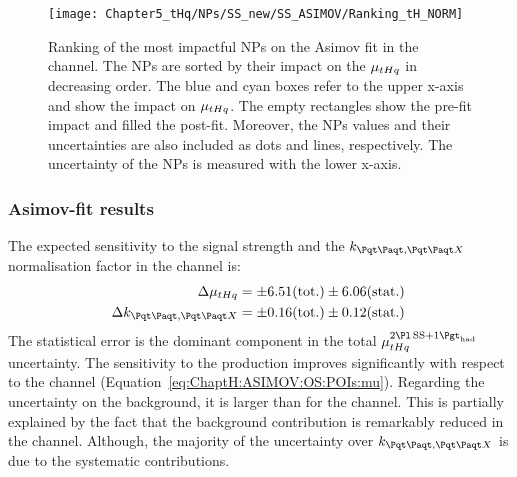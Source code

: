 \begin{figure}[h]%
    \centering
        \texttt{[image: Chapter5\_tHq/NPs/SS\_new/SS\_ASIMOV/Ranking\_tH\_NORM]}
    \caption{Ranking of the most impactful NPs on the Asimov fit in the \dilepSStau channel. 
    The NPs are sorted by their impact on the $\mu_{tHq}$ in decreasing order. 
    The blue and cyan boxes refer to the upper x-axis and show the impact on $\mu_{tHq}$.
    The empty rectangles show the pre-fit impact and filled the post-fit.
    Moreover, the NPs values and their uncertainties are also included as dots and 
    lines, respectively. The uncertainty of the NPs is measured with the lower x-axis.}
    \label{fig:ChaptH:Asimov:SS:Ranking}
\end{figure}




\subsubsection{Asimov-fit results \dilepSStau}
\label{sec:ChaptH:Fit:ASIMOV:SS:results}
The expected sensitivity to the \tHq signal strength and the $k_{\ttbar, \ttX}$ normalisation
factor in the \dilepSStau channel is:
\begin{align}
	\Delta \mu_{\tHq} 	&= \pm 6.51 (\text{tot.}) \pm 6.06 (\text{stat.}) 	\label{eq:ChaptH:Fit:ASIMOV:SS:mu} \\
	\Delta k_{\ttbar, \ttX} 	&= \pm 0.16 (\text{tot.}) \pm 0.12 (\text{stat.}) 	\label{eq:ChaptH:Fit:ASIMOV:SS:k} \,
\end{align}
The statistical error is the dominant component in the total $\mu^{\dilepSStau}_{\tHq}$ uncertainty.
The sensitivity to the \tHq production improves significantly with respect to the \dilepOStau channel
(Equation~\ref{eq:ChaptH:ASIMOV:OS:POIs:mu}). Regarding the uncertainty on the background,
it is larger than for the \dilepOStau channel. This is partially explained by the fact that the background
contribution is remarkably reduced in the \dilepSStau channel. Although, the majority of the
uncertainty over $k_{\ttbar, \ttX}$ is due to the systematic contributions. %


